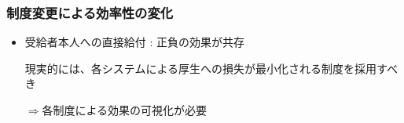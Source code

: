 \documentclass[dvipdfmx,14pt]{beamer}
\begin{document}
\begin{frame}\frametitle{制度変更による効率性の変化}

 \begin{itemize}
 
 \item 受給者本人への直接給付 : 正負の効果が共存
 
 現実的には、各システムによる厚生への損失が最小化される制度を採用すべき
 
 $\Rightarrow$各制度による効果の可視化が必要
 
 \end{itemize}

\end{frame}
\end{document}
